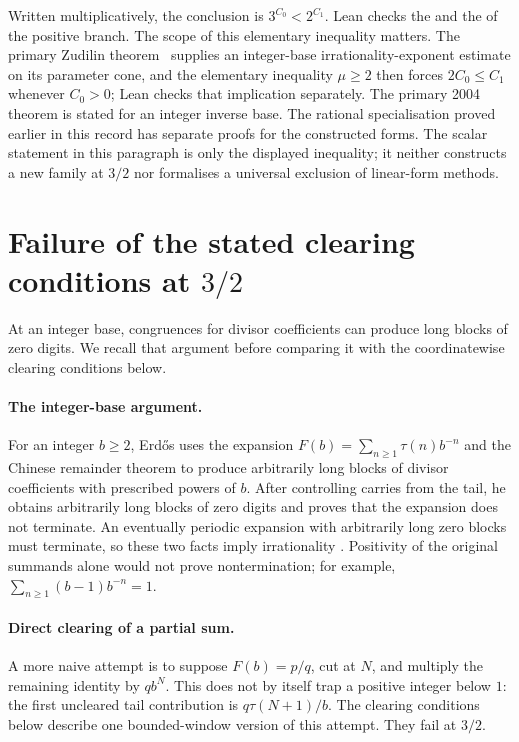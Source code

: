 \documentclass[11pt]{article}
\begin{document}
\noindent Written multiplicatively, the conclusion is \(3^{C_0}<2^{C_1}\).
Lean checks the
and the
of the positive branch.
The scope of this elementary inequality matters.  The primary Zudilin
theorem~\cite[Theorem~1, p.~154; Sec.~5, pp.~161--162]{zudilin2004} supplies an integer-base
irrationality-exponent estimate on its parameter cone, and the elementary
inequality \(\mu\ge2\) then forces \(2C_0\le C_1\) whenever \(C_0>0\); Lean
checks that implication separately.  The primary 2004 theorem is stated for an integer inverse base.
The rational specialisation proved earlier in this record has separate
proofs for the constructed forms. The scalar statement in this paragraph is
only the displayed inequality; it neither constructs a new family at
$3/2$ nor formalises a universal exclusion of linear-form methods.

\section{Failure of the stated clearing conditions at \texorpdfstring{$3/2$}{3/2}}\label{long1049:sec:corridor}

At an integer base, congruences for divisor coefficients can produce
long blocks of zero digits. We recall that argument before comparing
it with the coordinatewise clearing conditions below.

\paragraph{The integer-base argument.}
For an integer $b\ge2$, Erd\H{o}s uses the expansion
$F(b)=\sum_{n\ge1}\tau(n)b^{-n}$ and the Chinese remainder theorem to
produce arbitrarily long blocks of divisor coefficients with prescribed
powers of $b$. After controlling carries from the tail, he obtains
arbitrarily long blocks of zero digits and proves that the expansion
does not terminate. An eventually periodic expansion with arbitrarily
long zero blocks must terminate, so these two facts imply irrationality
\cite[pp.~63--66]{erdos1948}.
Positivity of the original summands alone would not prove nontermination;
for example, $\sum_{n\ge1}(b-1)b^{-n}=1$.

\paragraph{Direct clearing of a partial sum.}
A more naive attempt is to suppose $F(b)=p/q$, cut at $N$, and multiply the
remaining identity by $qb^N$.  This does not by itself trap a positive integer
below $1$: the first uncleared tail contribution is
$q\tau(N+1)/b$.  The clearing conditions below describe one bounded-window version
of this attempt. They fail at $3/2$.
\end{document}
